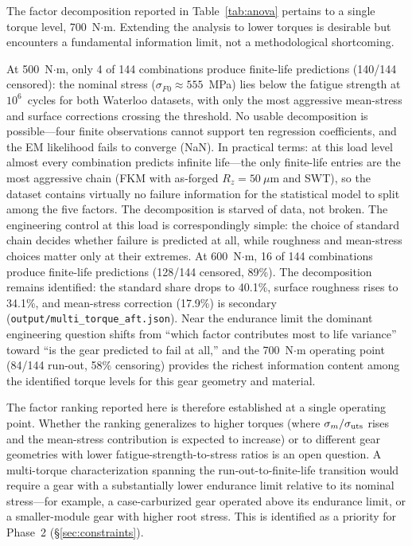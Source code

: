 \documentclass[twocolumn,12pt,a4paper]{article}
\begin{document}
The factor decomposition reported in Table~\ref{tab:anova} pertains to
a single torque level, 700~N$\cdot$m. Extending the analysis to lower
torques is desirable but encounters a fundamental information limit,
not a methodological shortcoming.

At 500~N$\cdot$m, only 4 of 144 combinations produce finite-life %
predictions (140/144 censored): the nominal stress
($\sigma_{F0} \approx 555$~MPa) lies below the fatigue strength
at $10^6$~cycles for both Waterloo datasets, with only the most
aggressive mean-stress and surface corrections crossing the
threshold. No usable decomposition is
possible---four finite observations cannot support ten regression
coefficients, and the EM likelihood fails to converge (NaN).
In practical terms: at this load level almost every combination
predicts infinite life---the only finite-life entries are the most
aggressive chain (FKM with as-forged $R_z{=}50~\mu$m and SWT), so the
dataset contains virtually no failure information for the statistical
model to split among the five factors. The decomposition is starved of
data, not broken. The engineering control at this load is
correspondingly simple: the choice of standard chain decides whether
failure is predicted at all, while roughness and mean-stress choices
matter only at their extremes.
At 600~N$\cdot$m, 16 of 144 combinations produce finite-life %
predictions (128/144 censored, 89\%). The decomposition remains
identified: the standard share drops to 40.1\%, surface roughness
rises to 34.1\%, and mean-stress correction (17.9\%) is secondary
(\texttt{output/multi\_torque\_aft.json}). Near the endurance limit
the dominant engineering question shifts from ``which factor
contributes most to life variance'' toward ``is the gear predicted to
fail at all,'' and the 700~N$\cdot$m operating point (84/144 run-out,
58\% censoring) provides the richest information content among the
identified torque levels for this gear geometry and material.

The factor ranking reported here is therefore established at a single
operating point. Whether the ranking generalizes to higher torques
(where $\sigma_m/\sigma_{\rm uts}$ rises and the mean-stress
contribution is expected to increase) or to different gear geometries
with lower fatigue-strength-to-stress ratios is an open question. A
multi-torque characterization spanning the run-out-to-finite-life
transition would require a gear with a substantially lower endurance
limit relative to its nominal stress---for example, a
case-carburized gear operated above its endurance limit, or a
smaller-module gear with higher root stress. This is identified as a
priority for Phase~2 (\S\ref{sec:constraints}).
\end{document}

